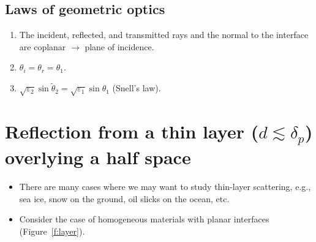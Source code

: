 \documentclass[11pt, oneside]{article}
\begin{document}
\subsection{Laws of geometric optics}

\begin{enumerate}
	\item The incident, reflected, and transmitted rays and the normal to the interface are coplanar $\rightarrow$ plane of incidence.
	\item $\theta_i = \theta_r = \theta_1$.
	\item $\sqrt{\varepsilon_2}\sin\tilde{\theta}_2 = \sqrt{\varepsilon_1}\sin\theta_1$ (Snell's law).
\end{enumerate}

\section{Reflection from a thin layer ($d \lesssim \delta_p$) overlying a half space}
\label{s:layer}

\begin{itemize}
	\item There are many cases where we may want to study thin-layer scattering, e.g., sea ice, snow on the ground, oil slicks on the ocean, etc.
	\item Consider the case of homogeneous materials with planar interfaces (Figure~\ref{f:layer}).
\end{itemize}
\end{document}
